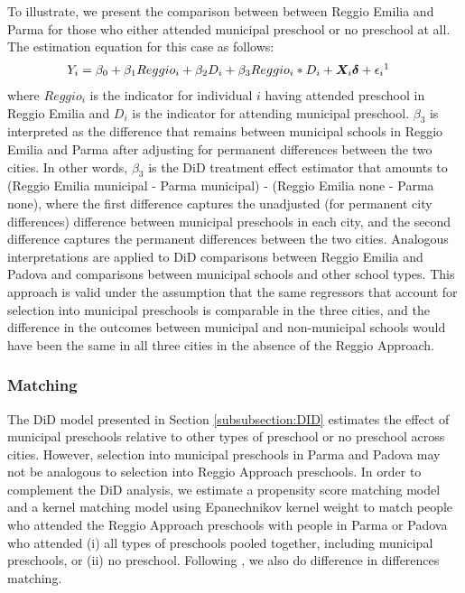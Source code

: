 To illustrate, we present the comparison between between Reggio Emilia and Parma for those who either attended municipal preschool or no preschool at all. The estimation equation for this case as follows:
\begin{eqnarray}\label{eq:specific2}
Y_i & = \beta_0 + \beta_1 Reggio_i + \beta_2 D_i + \beta_3 Reggio_i * D_i + \bm{X}_i \bm{\delta} + \epsilon_i\footnotemark
\end{eqnarray}
where $Reggio_i$ is the indicator for individual $i$ having attended preschool in Reggio Emilia and $D_i$ is the indicator for attending municipal preschool. $\beta_3$ is interpreted as the difference that remains between municipal schools in Reggio Emilia and Parma after adjusting for permanent differences between the two cities. In other words, $\beta_3$ is the DiD treatment effect estimator that amounts to (Reggio Emilia municipal - Parma municipal) - (Reggio Emilia none - Parma none), where the first difference captures the unadjusted (for permanent city differences) difference between municipal preschools in each city, and the second difference captures the permanent differences between the two cities. Analogous interpretations are applied to DiD comparisons between Reggio Emilia and Padova and comparisons between municipal schools and other school types. This approach is valid under the assumption that the same regressors that account for selection into municipal preschools is comparable in the three cities, and the difference in the outcomes between municipal and non-municipal schools would have been the same in all three cities in the absence of the Reggio Approach.

\subsubsection{Matching}

The DiD model presented in Section \ref{subsubsection:DID} estimates the effect of municipal preschools relative to other types of preschool or no preschool across cities. However, selection into municipal preschools in Parma and Padova may not be analogous to selection into Reggio Approach preschools. In order to complement the DiD analysis, we estimate a propensity score matching model and a kernel matching model using Epanechnikov kernel weight to match people who attended the Reggio Approach preschools with people in Parma or Padova who attended (i) all types of preschools pooled together, including municipal preschools, or (ii) no preschool. Following \cite{Heckman_Ichimura_etal_1998_Econometrica}, we also do difference in differences matching.

